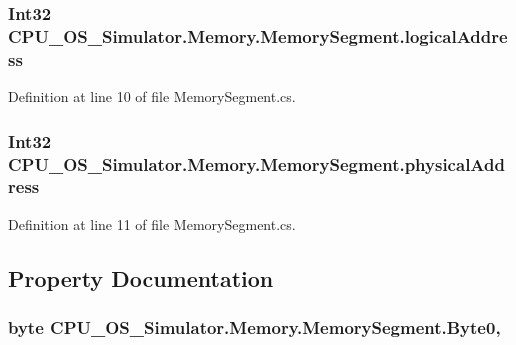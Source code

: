 \subsubsection[{logical\+Address}]{\setlength{\rightskip}{0pt plus 5cm}Int32 C\+P\+U\+\_\+\+O\+S\+\_\+\+Simulator.\+Memory.\+Memory\+Segment.\+logical\+Address\hspace{0.3cm}{\ttfamily [private]}}\label{class_c_p_u___o_s___simulator_1_1_memory_1_1_memory_segment_a27b4e22dcb1789a77734671f6d90e62e}


Definition at line 10 of file Memory\+Segment.\+cs.

\hypertarget{class_c_p_u___o_s___simulator_1_1_memory_1_1_memory_segment_a0477db48e8386456f2bd08632fd4508b}{}
\subsubsection[{physical\+Address}]{\setlength{\rightskip}{0pt plus 5cm}Int32 C\+P\+U\+\_\+\+O\+S\+\_\+\+Simulator.\+Memory.\+Memory\+Segment.\+physical\+Address\hspace{0.3cm}{\ttfamily [private]}}\label{class_c_p_u___o_s___simulator_1_1_memory_1_1_memory_segment_a0477db48e8386456f2bd08632fd4508b}


Definition at line 11 of file Memory\+Segment.\+cs.



\subsection{Property Documentation}
\hypertarget{class_c_p_u___o_s___simulator_1_1_memory_1_1_memory_segment_af1355b8170ad0461d479785ff6e1420d}{}
\subsubsection[{Byte0}]{\setlength{\rightskip}{0pt plus 5cm}byte C\+P\+U\+\_\+\+O\+S\+\_\+\+Simulator.\+Memory.\+Memory\+Segment.\+Byte0\hspace{0.3cm}{\ttfamily [get]}, {\ttfamily [set]}}\label{class_c_p_u___o_s___simulator_1_1_memory_1_1_memory_segment_af1355b8170ad0461d479785ff6e1420d}


